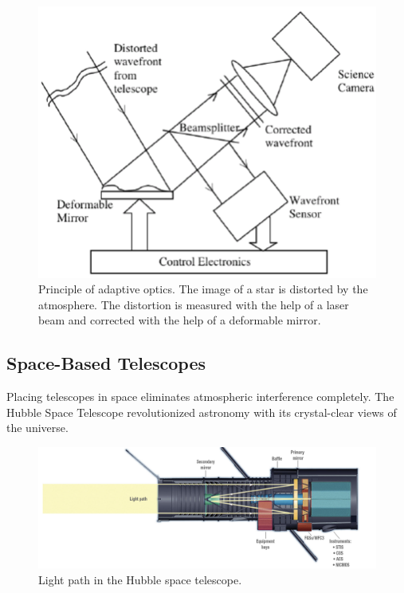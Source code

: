 \documentclass[
  a4paper,
]{book}
\begin{document}
\begin{figure}[H]

{\centering \includegraphics[width=0.5\linewidth,height=\textheight,keepaspectratio]{geometrical-optics/img/adaptive_optics.png}

}

\caption{Principle of adaptive optics. The image of a star is distorted
by the atmosphere. The distortion is measured with the help of a laser
beam and corrected with the help of a deformable mirror.}

\end{figure}%

\subsection{Space-Based Telescopes}\label{space-based-telescopes}

Placing telescopes in space eliminates atmospheric interference
completely. The Hubble Space Telescope revolutionized astronomy with its
crystal-clear views of the universe.

\begin{figure}[H]

{\centering \includegraphics[width=1\linewidth,height=\textheight,keepaspectratio]{geometrical-optics/img/hubble.png}

}

\caption{Light path in the Hubble space telescope.}

\end{figure}%
\end{document}
